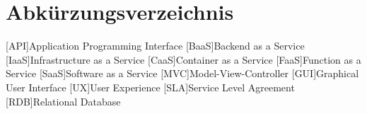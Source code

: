 \clearpage
\chapter*{Abkürzungsverzeichnis}	

\begin{acronym}[XXXXXXX] %
	[API]{Application Programming Interface}
	[BaaS]{Backend as a Service}
	[IaaS]{Infrastructure as a Service}
	[CaaS]{Container as a Service}
	[FaaS]{Function as a Service}
	[SaaS]{Software as a Service}
	[MVC]{Model-View-Controller}
	[GUI]{Graphical User Interface}
	[UX]{User Experience}
	[SLA]{Service Level Agreement}
	[RDB]{Relational Database}
\end{acronym}
